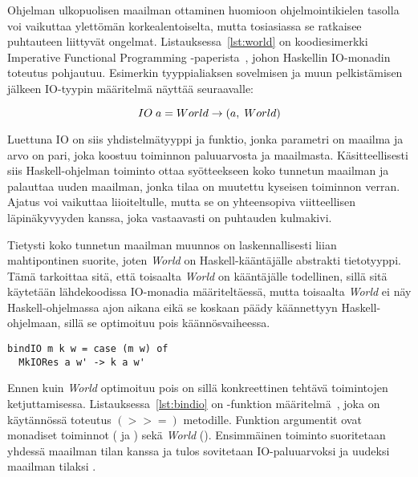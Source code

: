 \documentclass[finnish]{tktltiki2}
\begin{document}
Ohjelman ulkopuolisen maailman ottaminen huomioon ohjelmointikielen tasolla voi vaikuttaa ylettömän
korkealentoiselta, mutta tosiasiassa se ratkaisee puhtauteen liittyvät ongelmat.
Listauksessa~\ref{lst:world} on koodiesimerkki Imperative Functional Programming
-paperista~\cite{ifp93}, johon Haskellin IO-monadin toteutus pohjautuu. Esimerkin tyyppialiaksen
sovelmisen ja muun pelkistämisen jälkeen IO-tyypin määritelmä näyttää seuraavalle:

$$ IO\; a = World \rightarrow (a,\; World) $$

Luettuna IO on siis yhdistelmätyyppi ja funktio, jonka parametri on maailma ja arvo on pari, joka
koostuu toiminnon paluuarvosta ja maailmasta. Käsitteellisesti siis Haskell-ohjelman toiminto ottaa
syötteekseen koko tunnetun maailman ja palauttaa uuden maailman, jonka tilaa on muutettu kyseisen
toiminnon verran. Ajatus voi vaikuttaa liioiteltulle, mutta se on yhteensopiva viitteellisen
läpinäkyvyyden kanssa, joka vastaavasti on puhtauden kulmakivi.

Tietysti koko tunnetun maailman muunnos on laskennallisesti liian mahtipontinen suorite, joten
\emph{World} on Haskell-kääntäjälle abstrakti tietotyyppi. Tämä tarkoittaa sitä, että toisaalta
\emph{World} on kääntäjälle todellinen, sillä sitä käytetään lähdekoodissa IO-monadia
määriteltäessä, mutta toisaalta \emph{World} ei näy Haskell-ohjelmassa ajon aikana eikä se koskaan
päädy käännettyyn Haskell-ohjelmaan, sillä se optimoituu pois käännösvaiheessa.

\begin{lstlisting}[float,label={lst:bindio},caption={IFP, bindIO:n määritelmä}]
bindIO m k w = case (m w) of
  MkIORes a w' -> k a w'
\end{lstlisting}

Ennen kuin \emph{World} optimoituu pois on sillä konkreettinen tehtävä toimintojen ketjuttamisessa.
Listauksessa~\ref{lst:bindio} on -funktion määritelmä~\cite{ifp93}, joka on käytännössä
toteutus $(>>=)$ metodille. Funktion argumentit ovat monadiset toiminnot ( ja ) sekä
\emph{World} (). Ensimmäinen toiminto suoritetaan yhdessä maailman tilan kanssa ja tulos
sovitetaan IO-paluuarvoksi  ja uudeksi maailman tilaksi .


\end{document}
